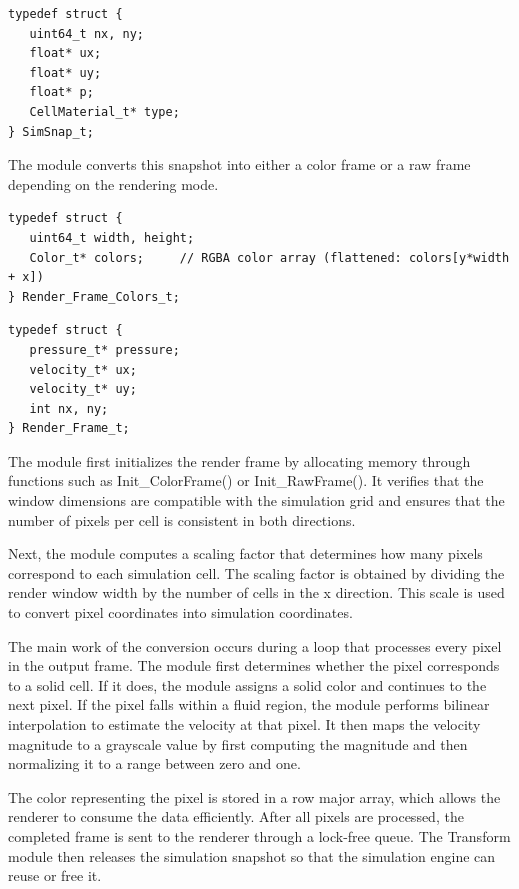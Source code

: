 \documentclass[12pt,a4paper]{article}
\begin{document}
\begin{verbatim}
typedef struct {
   uint64_t nx, ny;
   float* ux;
   float* uy;
   float* p;
   CellMaterial_t* type;
} SimSnap_t;
\end{verbatim}

The module converts this snapshot into either a color frame or a raw frame depending on the rendering mode.


\begin{verbatim}
typedef struct {
   uint64_t width, height;
   Color_t* colors;     // RGBA color array (flattened: colors[y*width + x])
} Render_Frame_Colors_t;
\end{verbatim}

\begin{verbatim}
typedef struct {
   pressure_t* pressure;
   velocity_t* ux;
   velocity_t* uy;
   int nx, ny;
} Render_Frame_t;
\end{verbatim}

The module first initializes the render frame by allocating memory through functions such as Init\_ColorFrame() or Init\_RawFrame(). It verifies that the window dimensions are compatible with the simulation grid and ensures that the number of pixels per cell is consistent in both directions.

Next, the module computes a scaling factor that determines how many pixels correspond to each simulation cell. The scaling factor is obtained by dividing the render window width by the number of cells in the x direction. This scale is used to convert pixel coordinates into simulation coordinates.

The main work of the conversion occurs during a loop that processes every pixel in the output frame. The module first determines whether the pixel corresponds to a solid cell. If it does, the module assigns a solid color and continues to the next pixel. If the pixel falls within a fluid region, the module performs bilinear interpolation to estimate the velocity at that pixel. It then maps the velocity magnitude to a grayscale value by first computing the magnitude and then normalizing it to a range between zero and one.

The color representing the pixel is stored in a row major array, which allows the renderer to consume the data efficiently. After all pixels are processed, the completed frame is sent to the renderer through a lock-free queue. The Transform module then releases the simulation snapshot so that the simulation engine can reuse or free it.
\end{document}
